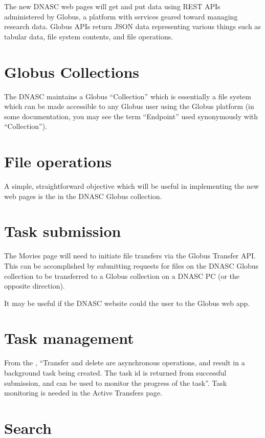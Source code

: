 
The new DNASC web pages will get and put data using REST APIs administered by Globus, 
a platform with services geared toward managing research data. Globus APIs return JSON 
data representing various things such as tabular data, file system contents, and file 
operations.
\section{Globus Collections}
The DNASC maintains a Globus ``Collection'' which is essentially a file system which 
can be made accessible to any Globus user using the Globus platform (in some documentation, 
you may see the term ``Endpoint'' used synonymously with ``Collection'').

\section{File operations}
A simple, straightforward objective which will be useful in implementing the new web 
pages is the  in the DNASC Globus collection.

\section{Task submission}
The Movies page will need to initiate file transfers via the Globus Transfer API. This 
can be accomplished by submitting requests for files on the DNASC Globus collection 
to be transferred to a Globus collection on a DNASC PC (or the opposite direction).

It may be useful if the DNASC website could  the user 
to the Globus web app.

\section{Task management\label{appendix:globusapis:taskmanagement}}
From the , ``Transfer and delete are asynchronous 
operations, and result in a background task being created. The task id is returned from 
successful submission, and can be used to monitor the progress of the task''. Task 
monitoring is needed in the Active Transfers page.

\section{Search}


